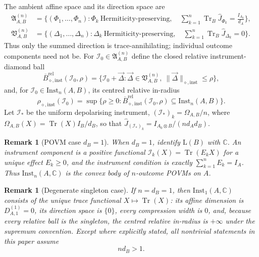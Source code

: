 \documentclass[11pt,a4paper]{article}
\newtheorem{remark}[theorem]{Remark}
\newcommand{\Lin}{\mathrm{L}}
\newcommand{\Inst}{\mathrm{Inst}}
\newcommand{\Tr}{\operatorname{Tr}}
\newcommand{\Jhat}{\widehat J}
\newcommand{\vD}{\vec{\Delta}}
\begin{document}
The ambient affine space and its direction space are
\begin{align*}
\mathfrak A_{A,B}^{(n)}
&=\Big\{(\Phi_1,\dots,\Phi_n):
\Phi_k\ \text{Hermiticity-preserving},\quad
\sum_{k=1}^n\Tr_B\Jhat_{\Phi_k}=\frac{I_{A_0}}{d_A}\Big\},\\
\mathfrak V_{A,B}^{(n)}
&=\Big\{(\Delta_1,\dots,\Delta_n):
\Delta_k\ \text{Hermiticity-preserving},\quad
\sum_{k=1}^n\Tr_B\Jhat_{\Delta_k}=0\Big\}.
\end{align*}
Thus only the summed direction is trace-annihilating; individual outcome components need not be. For $\mathcal I_0\in\mathfrak A_{A,B}^{(n)}$ define the closed relative instrument-diamond ball
\[
\overline B_{\diamond,\mathrm{inst}}^{\mathrm{rel}}(\mathcal I_0,\rho)
=\big\{\mathcal I_0+\vD:\vD\in\mathfrak V_{A,B}^{(n)},\ \|\vD\|_{\diamond,\mathrm{inst}}\le\rho\big\},
\]
and, for $\mathcal I_0\in\Inst_n(A,B)$, its centred relative in-radius
\[
\rho_{\diamond,\mathrm{inst}}(\mathcal I_0)
=\sup\Big\{\rho\ge0:
\overline B_{\diamond,\mathrm{inst}}^{\mathrm{rel}}(\mathcal I_0,\rho)
\subseteq\Inst_n(A,B)\Big\}.
\]
Let $\mathcal I_*$ be the uniform depolarising instrument, $(\mathcal I_*)_k=\Omega_{A,B}/n$, where $\Omega_{A,B}(X)=\Tr(X)I_B/d_B$, so that $\Jhat_{(\mathcal I_*)_k}=I_{A_0\otimes B}/(n d_Ad_B)$.

\begin{remark}[POVM case $d_B=1$]
\label{rem:povm}
When $d_B=1$, identify $\Lin(B)$ with $\mathbb C$. An instrument component is a positive functional $\mathcal I_k(X)=\Tr(E_kX)$ for a unique effect $E_k\ge0$, and the instrument condition is exactly $\sum_{k=1}^nE_k=I_A$. Thus $\Inst_n(A,\mathbb C)$ is the convex body of $n$-outcome POVMs on $A$.
\end{remark}

\begin{remark}[Degenerate singleton case]
\label{rem:degenerate}
If $n=d_B=1$, then $\Inst_1(A,\mathbb C)$ consists of the unique trace functional $X\mapsto\Tr(X)$: its affine dimension is $D_{A,1}^{(1)}=0$, its direction space is $\{0\}$, every compression width is $0$, and, because every relative ball is the singleton, the centred relative in-radius is $+\infty$ under the supremum convention. Except where explicitly stated, all nontrivial statements in this paper assume
\[
n d_B>1.
\]
\end{remark}
\end{document}
